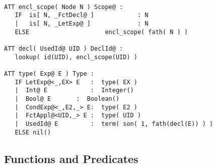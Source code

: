 \begin{verbatim}

ATT encl_scope( Node N ) Scope@ :
   IF  is[ N, _FctDecl@ ]            : N
   |   is[ N, _LetExp@ ]             : N 
   ELSE                     encl_scope( fath( N ) )

ATT decl( UsedId@ UID ) DeclId@ :
   lookup( id(UID), encl_scope(UID) )

ATT type( Exp@ E ) Type :
   IF LetExp@<_,EX> E   :  type( EX )
   |  Int@ E            :  Integer()
   |  Bool@ E   	:  Boolean()
   |  CondExp@<_,E2,_> E:  type( E2 ) 
   |  FctAppl@<UID,_> E :  type( UID ) 
   |  UsedId@ E         :  term( son( 1, fath(decl(E)) ) )
   ELSE nil()

\end{verbatim}
\subsection{Functions and Predicates}

